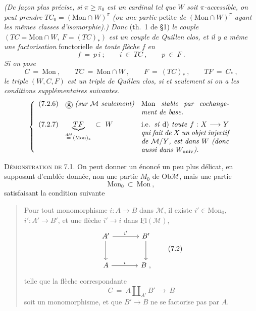 \documentclass[11pt]{article}
\newcommand{\msp}[1]{\marginpar{\raggedright\footnotesize [#1]}}
\newcommand{\Ob}{\mathrm{Ob}}
\newcommand{\Fl}{\mathrm{Fl}}
\newcommand{\cercle}[1]{\tikz[baseline=(X.base)]\node[draw,circle,inner sep=0.6pt](X){#1};}
\newcommand{\Mon}{\mathrm{Mon}}
\begin{document}
\textit{(De façon plus précise, si} $\pi \geq \pi_0$ \textit{est un cardinal tel que} $W$ \textit{soit} $\pi$\textit{-accessible, on peut prendre} $TC_0 = (\Mon \cap W)^{\pi}$ \textit{(ou une partie} petite \textit{de} $(\Mon \cap W)^{\pi}$ \textit{ayant les mêmes classes d'isomorphie).) Donc} (th.~1 de §1) \textit{le couple} $(TC = \Mon \cap W,\ F = (TC)_*)$ \textit{est un couple de Quillen clos, et il y a même une factorisation} fonctorielle \textit{de toute flèche} $f$ \textit{en}
\[
f \ = \ p\, i \ ; \qquad i \ \in \ TC \ , \qquad p \ \in \ F \ . \tag*{(7.2.4)}
\]
\textit{Si on pose}
\[
C \ = \ \Mon \ , \qquad TC \ = \ \Mon \cap W \ , \qquad F \ = \ (TC)_* \ , \qquad TF \ = \ C_* \ , \tag*{(7.2.5)}
\]
\textit{le triple} $(W, C, F)$ \textit{est un triple de Quillen clos, si et seulement si on a les conditions supplémentaires suivantes.}
\[
\left\{
\begin{array}{lll}
\text{(7.2.6)} & \cercle{g}\ \text{\textit{(sur $\mathcal{M}$ seulement)}} & \parbox[t]{0.36\textwidth}{Mon \textit{stable par cochangement de base.}} \\[4ex]
\text{(7.2.7)} & \underbrace{TF}_{\overset{\text{déf}}{=}\,(\Mon)_*} \ \subset \ W & \parbox[t]{0.36\textwidth}{i.e. \textit{si} d) \textit{toute} $f : X \longrightarrow Y$ \textit{qui fait de} $X$ \textit{un objet injectif de} $\mathcal{M}/Y$\textit{, est dans} $W$ \textit{(donc aussi dans} $W_{\mathrm{univ}}$\textit{).}}
\end{array}
\right.
\]

\msp{page 90}

\textsc{Démonstration de} 7.1. On peut donner un énoncé un peu plus délicat, en supposant d'emblée donnée, non une partie $M_0$ de $\Ob \mathcal{M}$, mais une partie
\[
\Mon_0 \ \subset \ \Mon \ , \tag*{(7.1)}
\]
satisfaisant la condition suivante

\begin{quote}
Pour tout monomorphisme $i : A \longrightarrow B$ dans $\mathcal{M}$, il existe $i' \in \Mon_0$, $i' : A' \longrightarrow B'$, et une flèche $i' \longrightarrow i$ dans $\underline{\Fl}(\mathcal{M})$,
\[
\begin{tikzcd}[row sep=large, column sep=large]
A' \arrow[r, "{i'}"] \arrow[d] & B' \arrow[d] \\
A \arrow[r, "i"] & B \ ,
\end{tikzcd}
\tag*{(7.2)}
\]
telle que la flèche correspondante
\[
C \ = \ A \amalg_{A'} B' \ \longrightarrow \ B
\]
soit un monomorphisme, et que $B' \longrightarrow B$ ne se factorise pas par $A$.
\end{quote}
\end{document}
